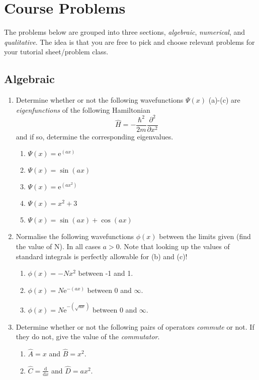 \documentclass{memoir}[11pt,oneside,a4paper,openany]
\begin{document}
\chapter*{Course Problems}
The problems below are grouped into three sections, \emph{algebraic}, \emph{numerical}, and \emph{qualitative}. The idea is that you are free to pick and choose relevant problems for your tutorial sheet/problem class. 
\section*{Algebraic}
\begin{enumerate}
	\item Determine whether or not the following wavefunctions $\Psi(x)$ (a)-(c) are \emph{eigenfunctions} of the following Hamiltonian
		\begin{equation} \hat{H} = -\frac{\hbar^2}{2m}\frac{\partial^2}{\partial x^2} \end{equation} and if so, determine the corresponding eigenvalues.
	\begin{enumerate}
		\item $\Psi(x) = \mathrm{e}^{(ax)}$
		\item $\Psi(x) = \sin(ax)$
		\item $\Psi(x) = \mathrm{e}^{(ax^2)}$
		\item $\Psi(x) = x^2+3$
		\item $\Psi(x) = \sin(ax) + \cos(ax)$
	\end{enumerate}
\item Normalise the following wavefunctions $\phi(x)$ between the limits given (find the value of N). In all cases $a>0$. Note that looking up the values of standard integrals is perfectly allowable for (b) and (c)! 
	\begin{enumerate}
		\item $\phi(x) = -Nx^2$ between -1 and 1.
		\item $\phi(x) = N\mathrm{e}^{-(ax)}$ between 0 and $\infty$. 
		\item $\phi(x) = N\mathrm{e}^{-(\sqrt{ax})}$ between 0 and $\infty$.
	\end{enumerate}
\item Determine whether or not the following pairs of operators \emph{commute} or not. If they do not, give the value of the \emph{commutator}.
	\begin{enumerate}
		\item $\hat{A} = x$ and $\hat{B} = x^2$.
		\item $\hat{C} = \frac{\mathrm{d}}{\mathrm{d}x}$ and $\hat{D} = ax^2$.

\end{enumerate}
\end{enumerate}
\end{document}
